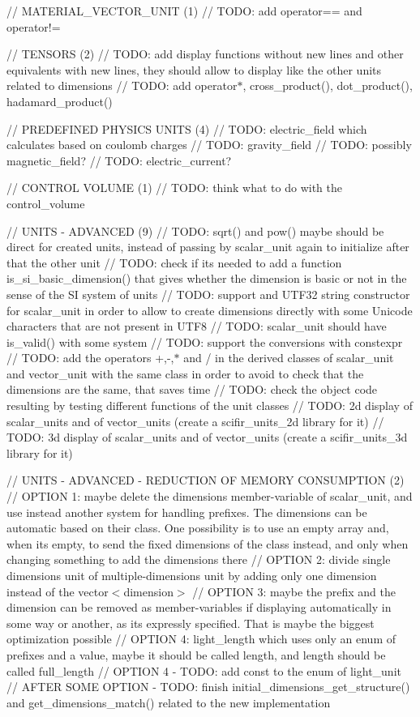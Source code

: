 // MATERIAL\+\_\+\+VECTOR\+\_\+\+UNIT (1) // TODO\+: add operator== and operator!=

// TENSORS (2) // TODO\+: add display functions without new lines and other equivalents with new lines, they should allow to display like the other units related to dimensions // TODO\+: add operator\texorpdfstring{$\ast$}{*}, cross\+\_\+product(), dot\+\_\+product(), hadamard\+\_\+product()

// PREDEFINED PHYSICS UNITS (4) // TODO\+: electric\+\_\+field which calculates based on coulomb charges // TODO\+: gravity\+\_\+field // TODO\+: possibly magnetic\+\_\+field? // TODO\+: electric\+\_\+current?

// CONTROL VOLUME (1) // TODO\+: think what to do with the control\+\_\+volume

// UNITS -\/ ADVANCED (9) // TODO\+: sqrt() and pow() maybe should be direct for created units, instead of passing by scalar\+\_\+unit again to initialize after that the other unit // TODO\+: check if it\textquotesingle{}s needed to add a function is\+\_\+si\+\_\+basic\+\_\+dimension() that gives whether the dimension is basic or not in the sense of the SI system of units // TODO\+: support and UTF32 string constructor for scalar\+\_\+unit in order to allow to create dimensions directly with some Unicode characters that are not present in UTF8 // TODO\+: scalar\+\_\+unit should have is\+\_\+valid() with some system // TODO\+: support the conversions with constexpr // TODO\+: add the operators +,-\/,\texorpdfstring{$\ast$}{*} and / in the derived classes of scalar\+\_\+unit and vector\+\_\+unit with the same class in order to avoid to check that the dimensions are the same, that saves time // TODO\+: check the object code resulting by testing different functions of the unit classes // TODO\+: 2d display of scalar\+\_\+units and of vector\+\_\+units (create a scifir\+\_\+units\+\_\+2d library for it) // TODO\+: 3d display of scalar\+\_\+units and of vector\+\_\+units (create a scifir\+\_\+units\+\_\+3d library for it)

// UNITS -\/ ADVANCED -\/ REDUCTION OF MEMORY CONSUMPTION (2) // OPTION 1\+: maybe delete the dimensions member-\/variable of scalar\+\_\+unit, and use instead another system for handling prefixes. The dimensions can be automatic based on their class. One possibility is to use an empty array and, when it\textquotesingle{}s empty, to send the fixed dimensions of the class instead, and only when changing something to add the dimensions there // OPTION 2\+: divide single dimensions unit of multiple-\/dimensions unit by adding only one dimension instead of the vector$<$dimension$>$ // OPTION 3\+: maybe the prefix and the dimension can be removed as member-\/variables if displaying automatically in some way or another, as it\textquotesingle{}s expressly specified. That is maybe the biggest optimization possible // OPTION 4\+: light\+\_\+length which uses only an enum of prefixes and a value, maybe it should be called length, and length should be called full\+\_\+length // OPTION 4 -\/ TODO\+: add const to the enum of light\+\_\+unit // AFTER SOME OPTION -\/ TODO\+: finish initial\+\_\+dimensions\+\_\+get\+\_\+structure() and get\+\_\+dimensions\+\_\+match() related to the new implementation

